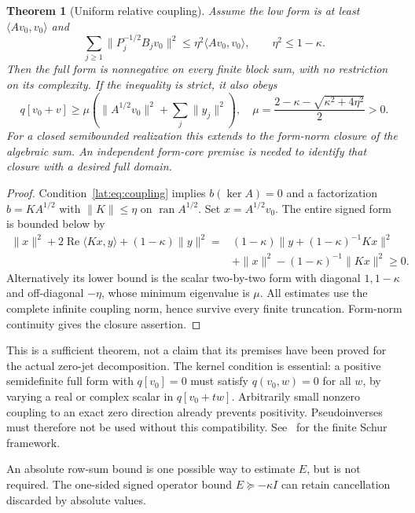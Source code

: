 \documentclass[11pt,a4paper]{article}
\numberwithin{equation}{section}
\newtheorem{theorem}{Theorem}[section]
\theoremstyle{definition}\newtheorem{definition}[theorem]{Definition}
\theoremstyle{remark}\newtheorem{remark}[theorem]{Remark}
\newcommand{\ip}[2]{\langle#1,#2\rangle}\newcommand{\norm}[1]{\lVert#1\rVert}\newcommand{\abs}[1]{\lvert#1\rvert}
\begin{document}
\begin{theorem}[Uniform relative coupling]\label{lat:thm:blocks}
Assume the low form is at least $\ip{Av_0}{v_0}$ and
\begin{equation}\label{lat:eq:coupling}
 \sum_{j\ge1}\norm{P_j^{-1/2}B_jv_0}^2
                  \le\eta^2\ip{Av_0}{v_0},\qquad
 \eta^2\le1-\kappa.
\end{equation}
Then the full form is nonnegative on every finite block sum, with no
restriction on its complexity. If the inequality is strict, it also obeys
\[
 q[v_0+v]\ge\mu\left(\norm{A^{1/2}v_0}^2+\sum_j\norm{y_j}^2\right),
 \quad
 \mu=\frac{2-\kappa-\sqrt{\kappa^2+4\eta^2}}2>0.
\]
For a closed semibounded realization this extends to the form-norm closure
of the algebraic sum. An independent form-core premise is needed to
identify that closure with a desired full domain.
\end{theorem}
\begin{proof}
Condition~\eqref{lat:eq:coupling} implies $b(\ker A)=0$ and a factorization
$b=K A^{1/2}$ with $\norm K\le\eta$ on $\operatorname{ran}A^{1/2}$.
Set $x=A^{1/2}v_0$. The entire signed form is bounded below by
\begin{align*}
 \norm x^2+2\operatorname{Re}\ip{Kx}y+(1-\kappa)\norm y^2
 ={}&(1-\kappa)\norm{y+(1-\kappa)^{-1}Kx}^2\\
 &+\norm x^2-(1-\kappa)^{-1}\norm{Kx}^2\ge0.
\end{align*}
Alternatively its lower bound is the scalar two-by-two form with diagonal
$1,1-\kappa$ and off-diagonal $-\eta$, whose minimum eigenvalue is $\mu$.
All estimates use the complete infinite coupling norm, hence survive every
finite truncation. Form-norm continuity gives the closure assertion.
\end{proof}

This is a sufficient theorem, not a claim that its premises have been proved
for the actual zero-jet decomposition. The kernel condition is essential:
a positive semidefinite full form with $q[v_0]=0$ must satisfy
$q(v_0,w)=0$ for all $w$, by varying a real or complex scalar in
$q[v_0+tw]$. Arbitrarily small nonzero coupling to an exact zero direction
already prevents positivity. Pseudoinverses must therefore not be used
without this compatibility. See~\cite{Boyd} for the finite Schur framework.

An absolute row-sum bound is one possible way to estimate $E$, but is
not required. The one-sided signed operator bound $E\succeq-\kappa I$
can retain cancellation discarded by absolute values.
\end{document}
